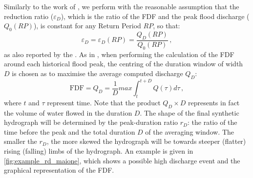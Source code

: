 Similarly to the work of \citet{Maione2003}, we perform with the reasonable assumption that the reduction ratio ($\varepsilon_D$), which is the ratio of the FDF and the peak flood discharge ($Q_0\left( RP \right)$), is constant for any Return Period $RP$, so that:
\begin{equation}
  \varepsilon_D = \varepsilon_D\left( RP \right) = \frac{Q_D\left( RP \right)}{Q_0\left( RP \right)}\,,
  \end{equation} 
as also reported by the \citet{NERC1975}.
As in \citet{Maione2003}, when performing the calculation of the FDF around each historical flood peak, the centring of the duration window of width $D$ is chosen as to maximise the average computed discharge $Q_D$:
\begin{equation}
  \text{FDF} = Q_D = \frac{1}{D} max \int_{t}^{t+D} Q \left(\tau \right) d\tau \,,
\end{equation}
where $t$ and $\tau$ represent time. Note that the product $Q_D \times D$ represents in fact the volume of water flowed in the duration $D$. The shape of the final synthetic hydrograph will be determined by the peak-duration ratio $r_D$: the ratio of the time before the peak and the total duration $D$ of the averaging window.
The smaller the $r_D$, the more skewed the hydrograph will be towards steeper (flatter) rising (falling) limbs of the hydrograph.
An example is given in \cref{fig:example_rd_maione}, which shows a possible high discharge event and the graphical representation of the FDF.

